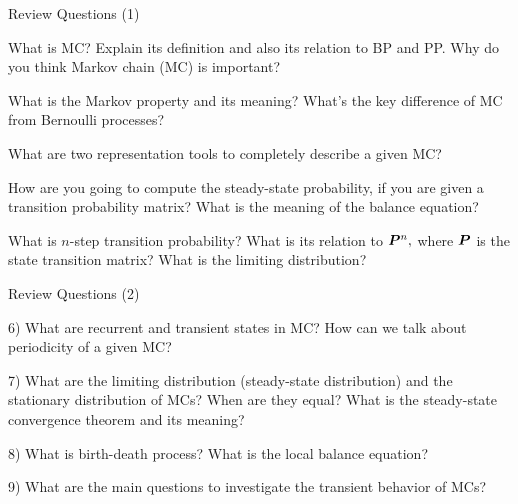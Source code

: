 \begin{frame}{Review Questions (1)}

  \plitemsep 0.1in
  
  
\bce[1)]
\item What is MC? Explain its definition and also its relation to BP
  and PP.  Why do you think Markov chain (MC) is important?

\item What is the Markov property and its meaning? What's the key difference of MC from Bernoulli processes?

\item What are two representation tools to completely describe a given
  MC? 

\item How are you going to compute the steady-state probability, if you
  are given a transition probability matrix? What is the meaning of
  the balance equation?

\item What is $n$-step transition probability? What is its relation to
  $\bm{P}^n,$ where $\bm{P}$ is the state transition matrix?
  What is the limiting distribution?


  \ece

\end{frame}

\begin{frame}{Review Questions (2)}

  \plitemsep 0.1in

  
\bci

\item[6)] What are recurrent and transient states in MC?
  How can we talk about periodicity of a given MC?

\item[7)] What are the limiting distribution (steady-state distribution)
  and the stationary distribution of MCs? When are they equal?
  What is the steady-state convergence theorem and its meaning? 

\item[8)] What is birth-death process? What is the local balance equation?  

\item[9)] What are the main questions to investigate the transient
  behavior of MCs?

  \eci

\end{frame}



